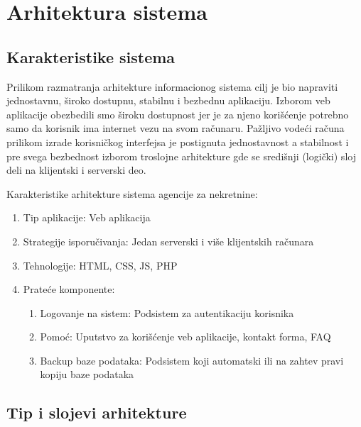\documentclass[20pt]{article}
\begin{document}
\newpage
\section{\bfseries \Large Arhitektura sistema} 
\setlength{\parindent}{1cm}
\fontsize{13}{18} \selectfont 

\subsection{\bfseries \Large Karakteristike sistema}
\setlength{\parindent}{1cm}
\fontsize{13}{18} \selectfont 

\indent Prilikom razmatranja arhitekture informacionog sistema cilj je bio napraviti jednostavnu, \v {s}iroko dostupnu, stabilnu i bezbednu aplikaciju. Izborom veb aplikacije obezbedili smo \v {s}iroku dostupnost jer je za njeno kori\v {s}\' {c}enje potrebno samo da korisnik ima internet vezu na svom ra\v {c}unaru. Pa\v {z}ljivo vode\' {c}i ra\v {c}una prilikom izrade korisni\v {c}kog interfejsa je postignuta jednostavnost a stabilnost i pre svega bezbednost izborom troslojne arhitekture gde se sredi\v {s}nji (logi\v {c}ki) sloj deli na klijentski i serverski deo. 

Karakteristike arhitekture sistema agencije za nekretnine:
\begin{enumerate}
         \item  Tip aplikacije: Veb aplikacija
         \item  Strategije isporu\v {c}ivanja: Jedan serverski i vi\v {s}e klijentskih ra\v {c}unara
         \item  Tehnologije: HTML, CSS, JS, PHP
         \item  Prate\' {c}e komponente:
         \begin{enumerate}
            \item Logovanje na sistem: Podsistem za autentikaciju korisnika
            \item Pomo\' {c}: Uputstvo za kori\v {s}\' {c}enje veb aplikacije, kontakt forma, FAQ
            \item Backup baze podataka: Podsistem koji automatski ili na zahtev pravi kopiju baze podataka
         \end{enumerate}
\end{enumerate}

\subsection{\bfseries \Large Tip i slojevi arhitekture}
\setlength{\parindent}{1cm}
\fontsize{13}{18} \selectfont 
\end{document}
